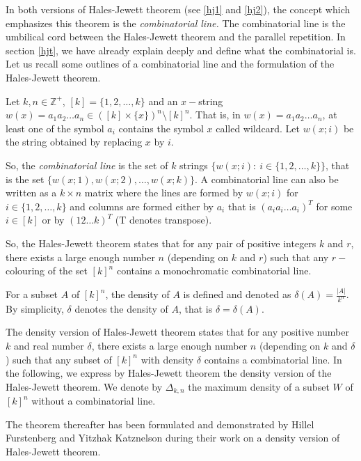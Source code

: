 In both versions of Hales-Jewett theorem (see \eqref{hj1} and \eqref{hj2}), the concept which emphasizes this theorem is the \textit{combinatorial line.} The combinatorial line is the umbilical cord between the Hales-Jewett theorem and the parallel repetition. In section \eqref{hjt}, we have already explain deeply and define what the combinatorial is. Let us recall some outlines of a combinatorial line and the formulation of the Hales-Jewett theorem.

Let $k, n\in \mathbb{Z}^+$, $[k]=\{1,2, \ldots,k\}$ and an $x-$string $w(x)=a_1a_2\ldots a_n \in ([k]\times\{x\})^n\setminus [k]^n.$ That is, in $w(x)=a_1a_2\ldots a_n$, at least one of the symbol   $a_i$ contains the symbol  $x$ called wildcard. Let $w(x;i)$ be the string obtained by replacing $x$ by $i$.

So, the \textit{combinatorial line} is the set of $k$ strings $\{w(x;i): \ i\in \{1,2,\ldots,k\} \}$, that is the set $\{w(x;1), w(x;2), \ldots, w(x;k)\}.$ A combinatorial line can also be written as a $k\times n$ matrix where the lines are formed by $w(x;i)$ for $i \in \{1,2,\ldots,k \}$ and columns are formed either  by $a_i$ that is $(a_ia_i\ldots a_i)^T$  for some $i \in [k]$ or by $(12\ldots k)^T$ (T denotes  transpose).
 
So, the Hales-Jewett theorem states that for any pair of positive integers $k$ and $r$, there exists a large enough number $n$ (depending on $k$ and $r$) such that  any $r-$colouring of the set  $[k]^n $ contains a monochromatic combinatorial line.

For a subset $A$ of $[k]^n$, the density of $A$ is defined and denoted as $\delta(A)=\frac{|A|}{k^n}.$ By simplicity, $\delta$ denotes the density of $A$, that is $\delta=\delta(A).$

The density version of Hales-Jewett theorem states that for any positive number $k$ and real number $\delta$,  there exists a large enough number $n$ (depending on $k$ and $\delta$) such that  any subset of  $[k]^n $ with density $\delta$ contains a combinatorial line.
In the following,  we express by Hales-Jewett theorem the density version of the Hales-Jewett theorem.
We denote by $\Delta_{k,n}$ the maximum density of a subset $W$ of $[k]^n$ without a combinatorial line. 

The theorem thereafter has been formulated and demonstrated  by Hillel Furstenberg and Yitzhak Katznelson  during their work on a density version of Hales-Jewett theorem. 

